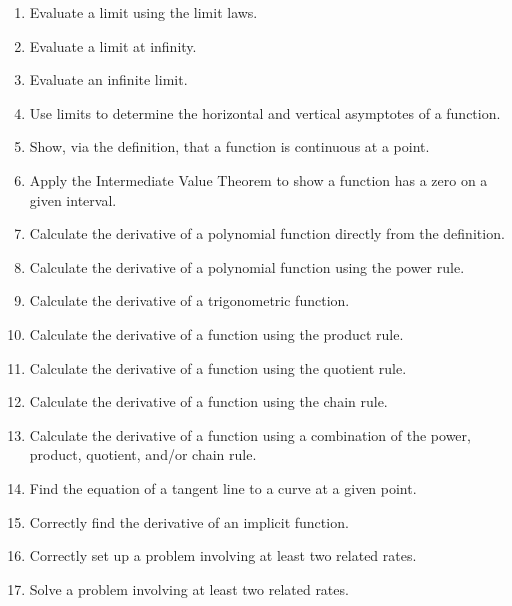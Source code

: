\documentclass[12pt,landscape]{article}
\begin{document}
\begin{multicols}{2}
\begin{enumerate}
\item Evaluate a limit using the limit laws.\\
\item Evaluate a limit at infinity.\\
\item Evaluate an infinite limit.\\
\item Use limits to determine the horizontal and vertical asymptotes of a function.\\
\item Show, via the definition, that a function is continuous at a point.\\
\item Apply the Intermediate Value Theorem to show a function has a zero on a given interval.\\
\item Calculate the derivative of a polynomial function directly from the definition.\\
\item Calculate the derivative of a polynomial function using the power rule.\\
\item Calculate the derivative of a trigonometric function.\\
\item Calculate the derivative of a function using the product rule.\\ 
\item Calculate the derivative of a function using the quotient rule.\\
\item Calculate the derivative of a function using the chain rule.\\
\item Calculate the derivative of a function using a combination of the power, product, quotient, and/or chain rule.\\
\item Find the equation of a tangent line to a curve at a given point.\\
\item Correctly find the derivative of an implicit function.\\
\item Correctly set up a problem involving at least two related rates.\\
\item Solve a problem involving at least two related rates.\\

\end{enumerate}
\end{multicols}
\end{document}
